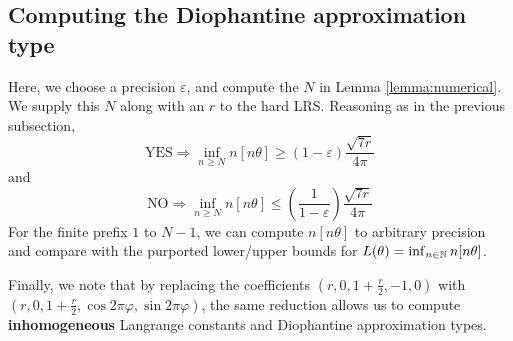 \subsection{Computing the Diophantine approximation type}
Here, we choose a precision $\varepsilon$, and compute the $N$ in Lemma \ref{lemma:numerical}. We supply this $N$ along with an $r$ to the hard LRS. Reasoning as in the previous subsection, 
$$
\text{YES} \Rightarrow \inf_{n \ge N} n[n\theta] \ge (1 - \varepsilon)\frac{\sqrt{7r}}{4\pi}
$$
and
$$
\text{NO} \Rightarrow \inf_{n \ge N} n[n\theta] \le \left(\frac{1}{1-\varepsilon}\right)\frac{\sqrt{7r}}{4\pi}
$$
For the finite prefix $1$ to $N-1$, we can compute $n[n\theta]$ to arbitrary precision and compare with the purported lower/upper bounds for $L(\theta) = \inf_{n \in \mathbb{N}} n[n\theta]$.

Finally, we note that by replacing the coefficients $(r, 0, 1 + \frac{r}{2}, -1, 0)$ with  $(r, 0, 1 + \frac{r}{2}, \cos 2\pi\varphi, \sin 2\pi\varphi)$, the same reduction allows us to compute \textbf{inhomogeneous} Langrange constants and Diophantine approximation types.
